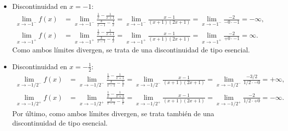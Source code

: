 {\begin{itemize}
\item Discontinuidad en $x=-1$:
\begin{align*}
\lim_{x\rightarrow -1^{-}}f(x) &= \lim_{x\rightarrow -1^{-}}\frac{\frac{1}{x}-\frac{1}{x+1}}{\frac{3}{x-1}-\frac{1}{x}} = \lim_{x\rightarrow -1^{-}}\frac{x-1}{\left( x+1\right) \left( 2x+1\right) } = \lim_{x\rightarrow -1^{-}}\frac{-2}{-0\cdot -1}=-\infty, \\
\lim_{x\rightarrow -1^{+}}f(x) &= \lim_{x\rightarrow -1^{+}}\frac{\frac{1}{x}-\frac{1}{x+1}}{\frac{3}{x-1}-\frac{1}{x}} = \lim_{x\rightarrow -1^{+}}\frac{x-1}{\left( x+1\right) \left( 2x+1\right) } = \lim_{x\rightarrow -1^{+}}\frac{-2}{+0\cdot -1}=\infty.
\end{align*}
Como ambos límites divergen, se trata de una discontinuidad de tipo esencial.

\item Discontinuidad en $x=-\frac{1}{2}$:
\begin{align*}
\lim_{x\rightarrow -1/2^{-}}f(x) &= \lim_{x\rightarrow -1/2^{-}}\frac{\frac{1}{x}-\frac{1}{x+1}}{\frac{3}{x-1}-\frac{1}{x}} = \lim_{x\rightarrow -1/2^{-}}\frac{x-1}{\left( x+1\right) \left( 2x+1\right) } = \lim_{x\rightarrow-1/2^{-}}\frac{-3/2}{1/2\cdot -0} = +\infty, \\
\lim_{x\rightarrow -1/2^{+}}f(x) &= \lim_{x\rightarrow -1/2^{+}}\frac{\frac{1}{x}-\frac{1}{x+1}}{\frac{3}{x-1}-\frac{1}{x}} = \lim_{x\rightarrow -1/2^{+}}\frac{x-1}{\left( x+1\right) \left( 2x+1\right) } = \lim_{x\rightarrow-1/2^{+}}\frac{-2}{1/2\cdot +0} = -\infty.
\end{align*}
Por último, como ambos límites divergen, se trata también de una discontinuidad de tipo esencial.
\end{itemize}
}